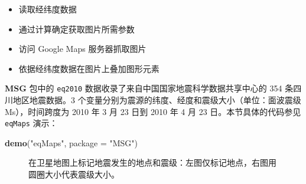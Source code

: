 \documentclass[
  b5paper,
  UTF8,twoside]{book}
\newenvironment{Shaded}{\begin{snugshade}}{\end{snugshade}}
\newcommand{\AttributeTok}[1]{\textcolor[rgb]{0.13,0.29,0.53}{#1}}
\newcommand{\FunctionTok}[1]{\textcolor[rgb]{0.13,0.29,0.53}{\textbf{#1}}}
\newcommand{\NormalTok}[1]{#1}
\newcommand{\StringTok}[1]{\textcolor[rgb]{0.31,0.60,0.02}{#1}}
\providecommand{\tightlist}{%
  \setlength{\itemsep}{0pt}\setlength{\parskip}{0pt}}
\begin{document}
\begin{itemize}
\tightlist
\item
  读取经纬度数据
\item
  通过计算确定获取图片所需参数
\item
  访问 Google Maps 服务器抓取图片
\item
  依据经纬度数据在图片上叠加图形元素
\end{itemize}

\textbf{MSG} 包中的 \texttt{eq2010} 数据收录了来自中国国家地震科学数据共享中心的 354 条四川地区地震数据。3 个变量分别为震源的纬度、经度和震级大小（单位：面波震级 Ms），时间跨度为 2010 年 3 月 23 日到 2010 年 4 月 23 日。本节具体的代码参见 \texttt{eqMaps} 演示：

\begin{Shaded}
\begin{Highlighting}[]
\FunctionTok{demo}\NormalTok{(}\StringTok{"eqMaps"}\NormalTok{, }\AttributeTok{package =} \StringTok{"MSG"}\NormalTok{)}
\end{Highlighting}
\end{Shaded}

\begin{figure}

{\centering {}

}

\caption[ 在卫星地图上标记地震发生的地点和震级 ]{在卫星地图上标记地震发生的地点和震级：左图仅标记地点，右图用圆圈大小代表震级大小。}\label{fig:RgoogleMaps}
\end{figure}
\end{document}
